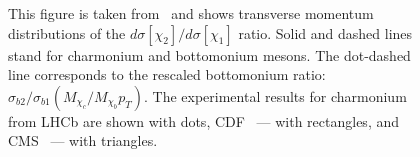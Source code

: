 \begin{figure}[ht]
  \setlength{\unitlength}{1mm}
  \centering
  \caption {\small This figure is taken from~\cite{Likhoded:2012hw} and shows
  transverse momentum distributions of the
$d\sigma\left[\chi_{2}\right]/d\sigma[\chi_{1}]$ ratio. Solid and dashed lines
stand for charmonium and bottomonium mesons. The dot-dashed line corresponds to
the rescaled bottomonium ratio:
$\sigma_{b2}/\sigma_{b1}(M_{\chi_c}/M_{\chi_b}p_T)$. The experimental results
for charmonium from LHCb\cite{LHCb-PAPER-2013-028} are shown with dots,
CDF~\cite{Abulencia:2007bra} --- with rectangles, and CMS~\cite{Chatrchyan:2012ub}
--- with triangles.}
  \label{fig:frac:ratio}
\end{figure} 
